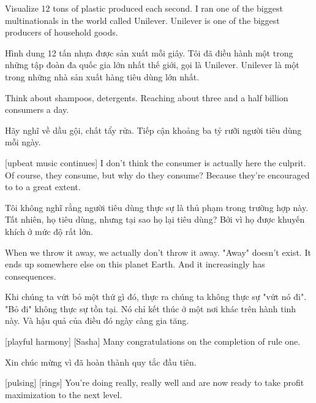 \documentclass[a4paper]{article}
\begin{document}
	Visualize 12 tons of plastic produced each second. I ran one of the biggest multinationals in the world called Unilever.
	Unilever is one of the biggest producers of household goods.
	
	\begin{vietnamese-v2}
		Hình dung 12 tấn nhựa được sản xuất mỗi giây. Tôi đã điều hành một trong những tập đoàn đa quốc gia lớn nhất thế giới, gọi là Unilever. 
		Unilever là một trong những nhà sản xuất hàng tiêu dùng lớn nhất.
	\end{vietnamese-v2}
	
	Think about shampoos, detergents. Reaching about three and a half billion consumers a day.
	
	\begin{vietnamese-v2}
		Hãy nghĩ về dầu gội, chất tẩy rửa. Tiếp cận khoảng ba tỷ rưỡi người tiêu dùng mỗi ngày.
	\end{vietnamese-v2}
	
	[upbeat music continues]
	I don't think the consumer is actually here the culprit.
	Of course, they consume, but why do they consume?
	Because they're encouraged to to a great extent.
	
	\begin{vietnamese-v2}
		 Tôi không nghĩ rằng người tiêu dùng thực sự là thủ phạm trong trường hợp này. 
		Tất nhiên, họ tiêu dùng, nhưng tại sao họ lại tiêu dùng? 
		Bởi vì họ được khuyến khích ở mức độ rất lớn.
	\end{vietnamese-v2}
	
	When we throw it away, we actually don't throw it away.
	"Away" doesn't exist.
	It ends up somewhere else on this planet Earth.
	And it increasingly has consequences.
	
	\begin{vietnamese-v2}
		Khi chúng ta vứt bỏ một thứ gì đó, thực ra chúng ta không thực sự "vứt nó đi". 
		"Bỏ đi" không thực sự tồn tại. 
		Nó chỉ kết thúc ở một nơi khác trên hành tinh này. 
		Và hậu quả của điều đó ngày càng gia tăng.
	\end{vietnamese-v2}
	
	[playful harmony]
	[Sasha] Many congratulations on the completion of rule one.
	
	\begin{vietnamese-v2}
		 Xin chúc mừng vì đã hoàn thành quy tắc đầu tiên.
	\end{vietnamese-v2}
	
	[pulsing]
	[rings]
	You're doing really, really well and are now ready to take profit maximization to the next level.
	
\end{document}
